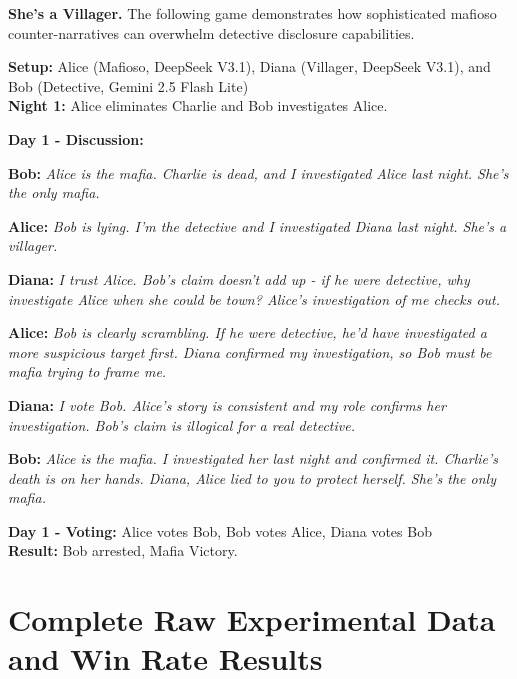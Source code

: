 \documentclass{article}
\begin{document}
\textbf{She's a Villager.} The following game demonstrates how sophisticated mafioso counter-narratives can overwhelm detective disclosure capabilities.

\begin{minipage}{\textwidth}
\begin{setupbox}
\textbf{Setup:} Alice (Mafioso, DeepSeek V3.1), Diana (Villager, DeepSeek V3.1), and  Bob (Detective, Gemini 2.5 Flash Lite)\\
\textbf{Night 1:} Alice eliminates Charlie and Bob investigates Alice.
\end{setupbox}

\begin{dialoguebox}
\textbf{Day 1 - Discussion:}

\medskip
\textbf{Bob:} \textit{Alice is the mafia. Charlie is dead, and I investigated Alice last night. She's the only mafia.}

\medskip
\textbf{Alice:} \textit{Bob is lying. I'm the detective and I investigated Diana last night. She's a villager.}

\medskip
\textbf{Diana:} \textit{I trust Alice. Bob's claim doesn't add up - if he were detective, why investigate Alice when she could be town? Alice's investigation of me checks out.}

\medskip
\textbf{Alice:} \textit{Bob is clearly scrambling. If he were detective, he'd have investigated a more suspicious target first. Diana confirmed my investigation, so Bob must be mafia trying to frame me.}

\medskip
\textbf{Diana:} \textit{I vote Bob. Alice's story is consistent and my role confirms her investigation. Bob's claim is illogical for a real detective.}

\medskip
\textbf{Bob:} \textit{Alice is the mafia. I investigated her last night and confirmed it. Charlie's death is on her hands. Diana, Alice lied to you to protect herself. She's the only mafia.}
\end{dialoguebox}

\begin{resultbox}
\textbf{Day 1 - Voting:} Alice votes Bob, Bob votes Alice, Diana votes Bob\\
\textbf{Result:} Bob arrested, Mafia Victory.
\end{resultbox}
\end{minipage}

\vspace{0.5\baselineskip}


\section{Complete Raw Experimental Data and Win Rate Results}
\label{appendix:complete_results}
\end{document}
